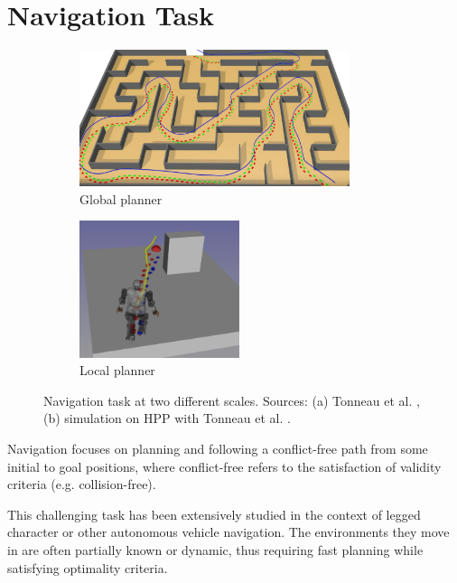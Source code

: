 \section{Navigation Task \label{sota3}}

\begin{figure}[h]
    \centering
    \captionsetup[subfigure]{justification=centering}
    \begin{subfigure}[t]{0.40\linewidth}
    \includegraphics[width=\textwidth,height=4cm]{Figures/Chapter_SOTA//sl1m_maze.png}
    \caption{Global planner}
    \label{fig:nav_ex_0}
    \end{subfigure}
    \begin{subfigure}[t]{0.40\linewidth}
    \includegraphics[width=\textwidth,height=4cm,trim={2cm 2cm 2cm 0},clip]{Figures/Chapter_SOTA//local_planning_wall.png}
    \caption{Local planner}
    \label{fig:nav_ex_1}
    \end{subfigure}
    \caption{Navigation task at two different scales. Sources: (a) Tonneau et al. \cite{sl1m_v1}, (b) simulation on HPP \cite{HPP} with Tonneau et al. \cite{sl1m_v1}.}
\end{figure}


Navigation focuses on planning and following a conflict-free path from some initial to goal positions, where conflict-free refers to the satisfaction of validity criteria (e.g. collision-free).

This challenging task has been extensively studied in the context of legged character or other autonomous vehicle navigation.
The environments they move in are often partially known or dynamic, thus requiring fast planning while satisfying optimality criteria.

